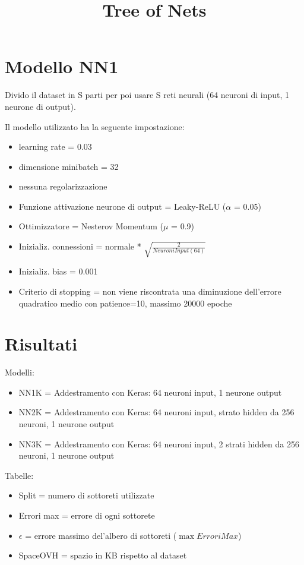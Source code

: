 \documentclass[]{article}
\title{\textbf{Tree of Nets}}
\author{\vspace{-7ex}}
\date{\vspace{-10ex}}
\begin{document}
	\maketitle
	
	\section{Modello NN1}
	Divido il dataset in S parti per poi usare S reti neurali (64 neuroni di input, 1 neurone di output).
	
	Il modello utilizzato ha la seguente impostazione:
	\begin{itemize}
		\item learning rate = 0.03
		\item dimensione minibatch = 32
		\item nessuna regolarizzazione
		\item Funzione attivazione neurone di output = Leaky-ReLU ($\alpha$ = 0.05)
		\item Ottimizzatore = Nesterov Momentum ($\mu$ = 0.9)
		\item Inizializ. connessioni = normale * $\sqrt{\frac{2}{NeuroniInput(64)}}$		
		\item Inizializ. bias = 0.001
		\item Criterio di stopping = non viene riscontrata una diminuzione dell'errore quadratico medio con patience=10, massimo 20000 epoche
	\end{itemize}
	
	

\section{Risultati}
	Modelli:
	\begin{itemize}
		\item NN1K = Addestramento con Keras: 64 neuroni input, 1 neurone output
		\item NN2K = Addestramento con Keras: 64 neuroni input, strato hidden da 256 neuroni, 1 neurone output
		\item NN3K = Addestramento con Keras: 64 neuroni input, 2 strati hidden da 256 neuroni, 1 neurone output
	\end{itemize}
	Tabelle:
	\begin{itemize}
		\item Split = numero di sottoreti utilizzate
		\item Errori max = errore di ogni sottorete
		\item $\epsilon$ = errore massimo del'albero di sottoreti ($\max{ErroriMax}$)
		\item SpaceOVH = spazio in KB rispetto al dataset
	\end{itemize}
	
\end{document}
